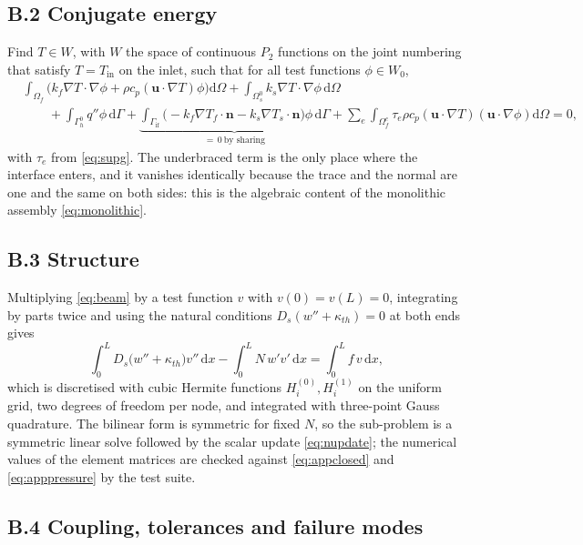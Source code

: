 \documentclass[11pt,a4paper]{article}
\newcommand{\bu}{\mathbf u}
\newcommand{\bn}{\mathbf n}
\newcommand{\Om}{\Omega}
\newcommand{\Ga}{\Gamma}
\newcommand{\dd}{\mathrm{d}}
\begin{document}
\subsection*{B.2 Conjugate energy}

Find $T\in W$, with $W$ the space of continuous $P_2$ functions on the joint
numbering that satisfy $T=T_{\mathrm{in}}$ on the inlet, such that for all
test functions $\phi\in W_0$,
\begin{equation}
\begin{aligned}
&\int_{\Om_f}\bigl(k_f\nabla T\cdot\nabla\phi
+\rho c_p(\bu\cdot\nabla T)\phi\bigr)\dd\Om
+\int_{\Om_s^0}k_s\nabla T\cdot\nabla\phi\,\dd\Om\\
&\qquad+\int_{\Ga_h^0}q''\phi\,\dd\Ga
+\underbrace{\int_{\Ga_{\mathrm{if}}}\bigl(-k_f\nabla T_f\cdot\bn
-k_s\nabla T_s\cdot\bn\bigr)\phi\,\dd\Ga}_{=\,0\ \text{by sharing}}
+\sum_e\int_{\Om_f^e}\tau_e\rho c_p(\bu\cdot\nabla T)(\bu\cdot\nabla\phi)\dd\Om=0,
\end{aligned}
\label{eq:weakthermal}
\end{equation}
with $\tau_e$ from \eqref{eq:supg}. The underbraced term is the only place
where the interface enters, and it vanishes identically because the trace and
the normal are one and the same on both sides: this is the algebraic content
of the monolithic assembly \eqref{eq:monolithic}.

\subsection*{B.3 Structure}

Multiplying \eqref{eq:beam} by a test function $v$ with $v(0)=v(L)=0$,
integrating by parts twice and using the natural conditions
$D_s(w''+\kappa_{th})=0$ at both ends gives
\begin{equation}
\int_0^L D_s\bigl(w''+\kappa_{th}\bigr)v''\,\dd x
-\int_0^L N\,w'v'\,\dd x=\int_0^L f\,v\,\dd x ,
\label{eq:weakbeam}
\end{equation}
which is discretised with cubic Hermite functions $H_i^{(0)},H_i^{(1)}$ on
the uniform grid, two degrees of freedom per node, and integrated with
three-point Gauss quadrature. The bilinear form is symmetric for fixed $N$,
so the sub-problem is a symmetric linear solve followed by the scalar update
\eqref{eq:nupdate}; the numerical values of the element matrices are checked
against \eqref{eq:appclosed} and \eqref{eq:apppressure} by the test suite.

\subsection*{B.4 Coupling, tolerances and failure modes}
\end{document}
